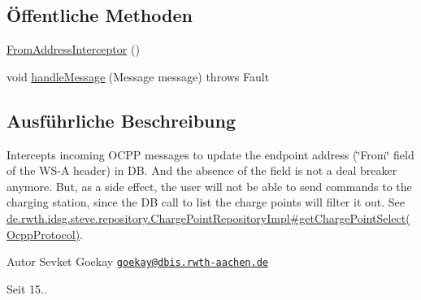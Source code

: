 \subsection*{Öffentliche Methoden}
\begin{DoxyCompactItemize}
\item 
\hyperlink{classde_1_1rwth_1_1idsg_1_1steve_1_1ocpp_1_1soap_1_1_from_address_interceptor_abbbe56bdd995abd805ade64990ceaccb}{From\-Address\-Interceptor} ()
\item 
void \hyperlink{classde_1_1rwth_1_1idsg_1_1steve_1_1ocpp_1_1soap_1_1_from_address_interceptor_a465f27cff6ca77abe462e05d4f5c545a}{handle\-Message} (Message message)  throws Fault 
\end{DoxyCompactItemize}


\subsection{Ausführliche Beschreibung}
Intercepts incoming O\-C\-P\-P messages to update the endpoint address (\char`\"{}\-From\char`\"{} field of the W\-S-\/\-A header) in D\-B. And the absence of the field is not a deal breaker anymore. But, as a side effect, the user will not be able to send commands to the charging station, since the D\-B call to list the charge points will filter it out. See \hyperlink{classde_1_1rwth_1_1idsg_1_1steve_1_1repository_1_1_charge_point_repository_impl_a7be1506cf87a9161535c228333011c01}{de.\-rwth.\-idsg.\-steve.\-repository.\-Charge\-Point\-Repository\-Impl\#get\-Charge\-Point\-Select(\-Ocpp\-Protocol)}.

\begin{DoxyAuthor}{Autor}
Sevket Goekay \href{mailto:goekay@dbis.rwth-aachen.de}{\tt goekay@dbis.\-rwth-\/aachen.\-de} 
\end{DoxyAuthor}
\begin{DoxySince}{Seit}
15.. 
\end{DoxySince}


